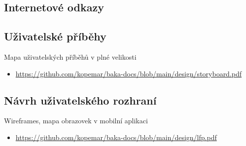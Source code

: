 \documentclass[twoside]{ctuthesis}
\begin{document}
\begin{enumerate}[label=\textbf{O\arabic*.}]
%
%

\printbibliography[title={Seznam použité literatury}]

\appendix

%



\chapter{Internetové odkazy}
\section{Uživatelské příběhy}\label{sec:ui}

Mapa uživatelských příběhů v plné velikosti
\begin{itemize}
	\item \url{https://github.com/kopemar/baka-docs/blob/main/design/storyboard.pdf}
\end{itemize}


\section{Návrh uživatelského rozhraní}\label{sec:ui}

Wireframes, mapa obrazovek v mobilní aplikaci
\begin{itemize}
	\item \url{https://github.com/kopemar/baka-docs/blob/main/design/lfp.pdf}
\end{itemize}





\end{enumerate}
\end{document}
